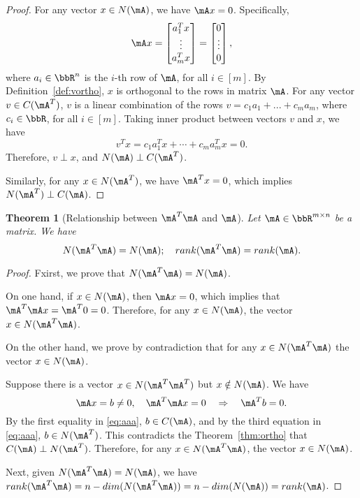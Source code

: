 \documentclass[11pt]{article}
\theoremstyle{plain}
\newtheorem{thm}{Theorem}[section]
\theoremstyle{definition}
\begin{document}
\begin{proof}
	For any vector $x \in N(\mA)$, we have $\mA x = 0$. Specifically,
	\begin{align}
		\mA x  = \begin{bmatrix}
			a_1^T x \\ \vdots \\ a_m^T x 
		\end{bmatrix} = \begin{bmatrix}
			0\\ \vdots \\0
		\end{bmatrix},
	\end{align}
	where $a_i \in \bbR^n$ is the $i$-th  row of $\mA$, for all $ i \in [m]$. By Definition~\ref{def:vortho}, $x$ is orthogonal to the rows in matrix $\mA$. For any vector $v \in C(\mA^T)$, $v$ is a linear combination of the rows $v = c_1 a_1 + ...+c_m a_m$, where $c_i \in \bbR$, for all $i\in [m]$. Taking inner product between vectors $v$ and $x$, we have
	\[  v^T x =  c_1 a_1^T x + \cdots + c_m a_m^T x = 0.  \]
	Therefore, $v \perp x$, and $N(\mA) \perp C(\mA^T)$.
	
	Similarly, for any $x \in N(\mA^T)$, we have $\mA^T x = 0$, which implies $N(\mA^T) \perp C(\mA)$. 
\end{proof}

\begin{thm}[Relationship between $\mA^T \mA$ and $\mA$]\label{thm:aa}Let $\mA \in \bbR^{m \times n}$ be a matrix. We have
	\begin{equation}
		N(\mA^T \mA) = N(\mA) ; \quad rank(\mA^T \mA) = rank(\mA).
	\end{equation}
\end{thm}
\begin{proof}
	Fxirst, we prove that $N(\mA^T \mA) = N(\mA)$.
	
	On one hand, if $x \in N(\mA)$, then $\mA x = 0$, which implies that $ \mA^T  \mA x = \mA^T 0 = 0$. Therefore, for any $x \in N(\mA)$, the vector $x \in N(\mA^T \mA)$. 
	
	
	On the other hand, we  prove  by contradiction that for any $x \in N(\mA^T \mA)$ the vector $x \in N(\mA)$.
	
	Suppose there is a vector $x \in N(\mA^T \mA^T)$ but $x \notin N(\mA)$. We have
	\begin{equation}\label{eq:aaa}
		\mA x = b \neq 0, \quad \mA^T \mA x = 0 \quad \Rightarrow \quad \mA^T b = 0.
	\end{equation} 
	By the first equality in \eqref{eq:aaa}, $b \in C(\mA)$, and by the third equation in \eqref{eq:aaa}, $ b \in N(\mA^T)$. This contradicts the Theorem~\ref{thm:ortho} that $C(\mA) \perp N(\mA^T)$. Therefore, for any $x \in N(\mA^T \mA)$, the vector $x \in N(\mA)$.
	
	Next, given $N(\mA^T \mA) = N(\mA)$, we have $rank(\mA^T \mA) = n - dim(N(\mA^T \mA)) = n - dim(N(\mA)) = rank(\mA)$.
\end{proof}
\end{document}
